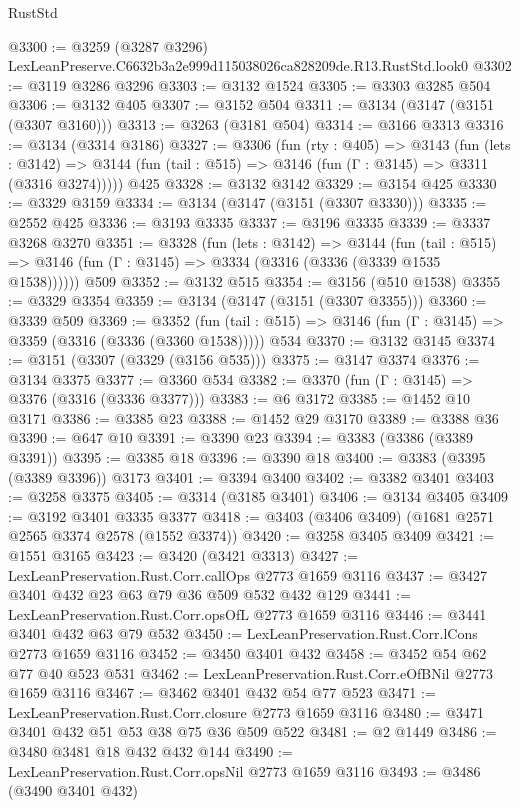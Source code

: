 \begin{lexlean}{RustStd}
\begin{coremodule}
@3300 := @3259 (@3287 @3296) LexLeanPreserve.C6632b3a2e999d115038026ca828209de.R13.RustStd.look0
@3302 := @3119 @3286 @3296
@3303 := @3132 @1524
@3305 := @3303 @3285 @504
@3306 := @3132 @405
@3307 := @3152 @504
@3311 := @3134 (@3147 (@3151 (@3307 @3160)))
@3313 := @3263 (@3181 @504)
@3314 := @3166 @3313
@3316 := @3134 (@3314 @3186)
@3327 := @3306
    (fun (rty : @405) =>
    @3143
      (fun (lets : @3142) =>
      @3144 (fun (tail : @515) => @3146 (fun (Γ : @3145) => @3311 (@3316 @3274)))))
    @425
@3328 := @3132 @3142
@3329 := @3154 @425
@3330 := @3329 @3159
@3334 := @3134 (@3147 (@3151 (@3307 @3330)))
@3335 := @2552 @425
@3336 := @3193 @3335
@3337 := @3196 @3335
@3339 := @3337 @3268 @3270
@3351 := @3328
    (fun (lets : @3142) =>
    @3144
      (fun (tail : @515) => @3146 (fun (Γ : @3145) => @3334 (@3316 (@3336 (@3339 @1535 @1538))))))
    @509
@3352 := @3132 @515
@3354 := @3156 (@510 @1538)
@3355 := @3329 @3354
@3359 := @3134 (@3147 (@3151 (@3307 @3355)))
@3360 := @3339 @509
@3369 := @3352
    (fun (tail : @515) => @3146 (fun (Γ : @3145) => @3359 (@3316 (@3336 (@3360 @1538)))))
    @534
@3370 := @3132 @3145
@3374 := @3151 (@3307 (@3329 (@3156 @535)))
@3375 := @3147 @3374
@3376 := @3134 @3375
@3377 := @3360 @534
@3382 := @3370 (fun (Γ : @3145) => @3376 (@3316 (@3336 @3377)))
@3383 := @6 @3172
@3385 := @1452 @10 @3171
@3386 := @3385 @23
@3388 := @1452 @29 @3170
@3389 := @3388 @36
@3390 := @647 @10
@3391 := @3390 @23
@3394 := @3383 (@3386 (@3389 @3391))
@3395 := @3385 @18
@3396 := @3390 @18
@3400 := @3383 (@3395 (@3389 @3396)) @3173
@3401 := @3394 @3400
@3402 := @3382 @3401
@3403 := @3258 @3375
@3405 := @3314 (@3185 @3401)
@3406 := @3134 @3405
@3409 := @3192 @3401 @3335 @3377
@3418 := @3403 (@3406 @3409) (@1681 @2571 @2565 @3374 @2578 (@1552 @3374))
@3420 := @3258 @3405 @3409
@3421 := @1551 @3165
@3423 := @3420 (@3421 @3313)
@3427 := LexLeanPreservation.Rust.Corr.callOps @2773 @1659 @3116
@3437 := @3427 @3401 @432 @23 @63 @79 @36 @509 @532 @432 @129
@3441 := LexLeanPreservation.Rust.Corr.opsOfL @2773 @1659 @3116
@3446 := @3441 @3401 @432 @63 @79 @532
@3450 := LexLeanPreservation.Rust.Corr.lCons @2773 @1659 @3116
@3452 := @3450 @3401 @432
@3458 := @3452 @54 @62 @77 @40 @523 @531
@3462 := LexLeanPreservation.Rust.Corr.eOfBNil @2773 @1659 @3116
@3467 := @3462 @3401 @432 @54 @77 @523
@3471 := LexLeanPreservation.Rust.Corr.closure @2773 @1659 @3116
@3480 := @3471 @3401 @432 @51 @53 @38 @75 @36 @509 @522
@3481 := @2 @1449
@3486 := @3480 @3481 @18 @432 @432 @144
@3490 := LexLeanPreservation.Rust.Corr.opsNil @2773 @1659 @3116
@3493 := @3486 (@3490 @3401 @432)

\end{coremodule}
\end{lexlean}
